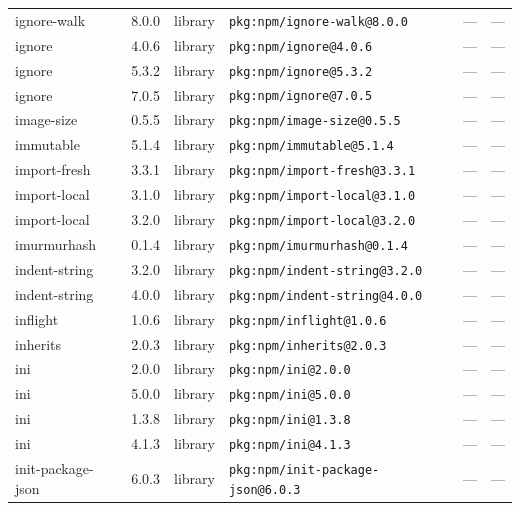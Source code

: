 \documentclass[11pt,a4paper]{article}
\begin{document}
\begin{longtable}{|p{4cm}|p{2cm}|p{1.6cm}|p{5cm}|p{1.5cm}|p{3.5cm}|}
\raggedright ignore-walk & 8.0.0 & library & \small\texttt{pkg:npm/ignore-walk@8.0.0} & — & \small — \\
\raggedright ignore & 4.0.6 & library & \small\texttt{pkg:npm/ignore@4.0.6} & — & \small — \\
\raggedright ignore & 5.3.2 & library & \small\texttt{pkg:npm/ignore@5.3.2} & — & \small — \\
\raggedright ignore & 7.0.5 & library & \small\texttt{pkg:npm/ignore@7.0.5} & — & \small — \\
\raggedright image-size & 0.5.5 & library & \small\texttt{pkg:npm/image-size@0.5.5} & — & \small — \\
\raggedright immutable & 5.1.4 & library & \small\texttt{pkg:npm/immutable@5.1.4} & — & \small — \\
\raggedright import-fresh & 3.3.1 & library & \small\texttt{pkg:npm/import-fresh@3.3.1} & — & \small — \\
\raggedright import-local & 3.1.0 & library & \small\texttt{pkg:npm/import-local@3.1.0} & — & \small — \\
\raggedright import-local & 3.2.0 & library & \small\texttt{pkg:npm/import-local@3.2.0} & — & \small — \\
\raggedright imurmurhash & 0.1.4 & library & \small\texttt{pkg:npm/imurmurhash@0.1.4} & — & \small — \\
\raggedright indent-string & 3.2.0 & library & \small\texttt{pkg:npm/indent-string@3.2.0} & — & \small — \\
\raggedright indent-string & 4.0.0 & library & \small\texttt{pkg:npm/indent-string@4.0.0} & — & \small — \\
\raggedright inflight & 1.0.6 & library & \small\texttt{pkg:npm/inflight@1.0.6} & — & \small — \\
\raggedright inherits & 2.0.3 & library & \small\texttt{pkg:npm/inherits@2.0.3} & — & \small — \\
\raggedright ini & 2.0.0 & library & \small\texttt{pkg:npm/ini@2.0.0} & — & \small — \\
\raggedright ini & 5.0.0 & library & \small\texttt{pkg:npm/ini@5.0.0} & — & \small — \\
\raggedright ini & 1.3.8 & library & \small\texttt{pkg:npm/ini@1.3.8} & — & \small — \\
\raggedright ini & 4.1.3 & library & \small\texttt{pkg:npm/ini@4.1.3} & — & \small — \\
\raggedright init-package-json & 6.0.3 & library & \small\texttt{pkg:npm/init-package-json@6.0.3} & — & \small — \\

\end{longtable}
\end{document}
